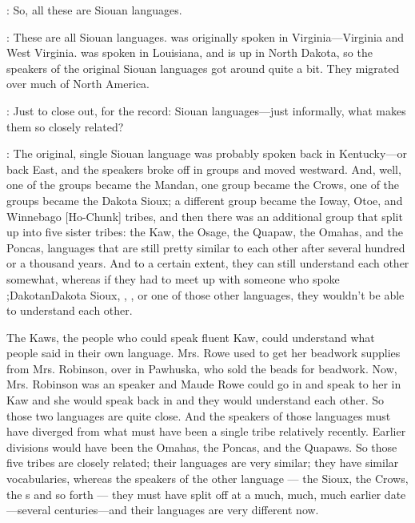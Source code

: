\documentclass[output=paper]{LSP/langsci}
\begin{document}
: So, all these are Siouan languages.

: These are all Siouan languages.  was originally spoken in Virginia---Virginia and West Virginia.  was spoken in Louisiana, and  is up in North Dakota, so the speakers of the original Siouan languages got around quite a bit. They migrated over much of North America.

: Just to close out, for the record: Siouan languages---just informally, what makes them so closely related?

: The original, single Siouan language was probably spoken back in Kentucky---or back East, and the speakers broke off in groups and moved westward. And, well, one of the groups became the Mandan, one group became the Crows, one of the groups became the Dakota Sioux; a different group became the Ioway, Otoe, and Winnebago [Ho-Chunk] tribes, and then there was an additional group that split up into five sister tribes: the Kaw, the Osage, the Quapaw, the Omahas, and the Poncas, languages that are still pretty similar to each other after several hundred or a thousand years. And to a certain extent, they can still understand each other somewhat, whereas if they had to meet up with someone who spoke \il;{Dakotan}Dakota Sioux, , , or one of those other languages, they wouldn't be able to understand each other.

The Kaws, the people who could speak fluent Kaw, could understand what  people said in their own language. Mrs. Rowe used to get her beadwork supplies from Mrs. Robinson, over in Pawhuska, who sold the beads for beadwork. Now, Mrs. Robinson was an  speaker and Maude Rowe could go in and speak to her in Kaw and she would speak back in  and they would understand each other. So those two languages are quite close. And the speakers of those languages must have diverged from what must have been a single tribe relatively recently. Earlier divisions would have been the Omahas, the Poncas, and the Quapaws. So those five tribes are closely related; their languages are very similar; they have similar vocabularies, whereas the speakers of the other language --- the Sioux, the Crows, the s and so forth --- they must have split off at a much, much, much earlier date---several centuries---and their languages are very different now.
\end{document}
